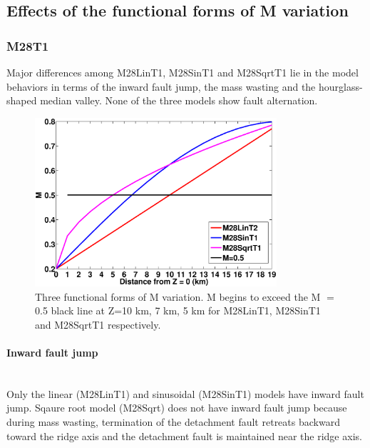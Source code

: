 \subsection{Effects of the functional forms of M variation}

\subsubsection{M28T1}

Major differences among M28LinT1, M28SinT1 and M28SqrtT1 lie in the model behaviors in terms of the inward fault jump, the mass wasting and the hourglass-shaped median valley. None of the three models show fault alternation.    

\begin{figure}[h]
  \centering
    \includegraphics[width=0.8\textwidth]{./Figures/fig_Results_3_3_M_variation.eps}
  \caption[Three functional forms of M variation.]{Three functional forms of M variation. M begins to exceed the M $=$ 0.5 black line at Z=10 km, 7 km, 5 km for M28LinT1, M28SinT1 and M28SqrtT1 respectively.}
 \label{fig_Results3_1}
\end{figure}   

\paragraph{Inward fault jump}\label{para_InwardFaultJump}
~\\
Only the linear (M28LinT1) and sinusoidal (M28SinT1) models have inward fault jump. Sqaure root model (M28Sqrt) does not have inward fault jump because during mass wasting, termination of the detachment fault retreats backward toward the ridge axis and the detachment fault is maintained near the ridge axis.

